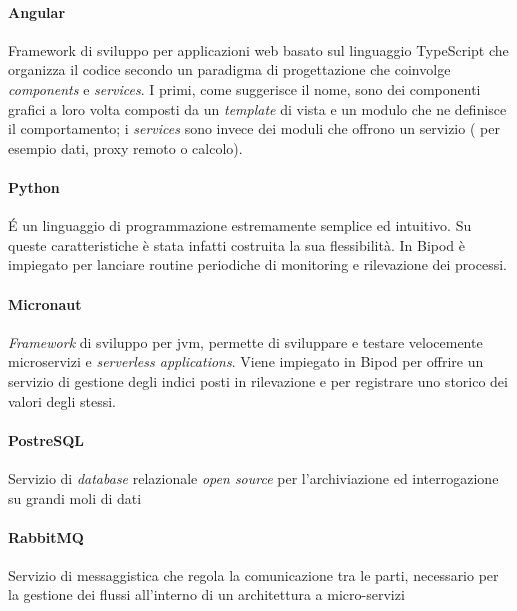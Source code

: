 \paragraph{Angular} Framework di sviluppo per applicazioni web basato sul linguaggio TypeScript che organizza il codice secondo un paradigma di progettazione che coinvolge \textit{components} e \textit{services}. I primi, come suggerisce il nome, sono dei componenti grafici a loro volta composti da un \textit{template} di vista e un modulo che ne definisce il comportamento; i \textit{services} sono invece dei moduli che offrono un servizio ( per esempio dati, proxy remoto o calcolo).
\paragraph{Python} \'E un linguaggio di programmazione estremamente semplice ed intuitivo. Su queste caratteristiche è stata infatti costruita la sua flessibilità. In Bipod è impiegato per lanciare routine periodiche di monitoring e rilevazione dei processi.
\paragraph{Micronaut} \textit{Framework} di sviluppo per \acrshort{jvm}, permette di sviluppare e testare velocemente microservizi e \textit{serverless applications}. Viene impiegato in Bipod per offrire un servizio di gestione degli indici posti in rilevazione e per registrare uno storico dei valori degli stessi.
\paragraph{PostreSQL} Servizio di \textit{database} relazionale \textit{open source} per l'archiviazione ed interrogazione su grandi moli di dati
\paragraph{RabbitMQ} Servizio di messaggistica che regola la comunicazione tra le parti, necessario per la gestione dei flussi all'interno di un architettura a micro-servizi



